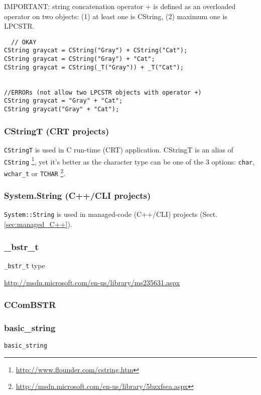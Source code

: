 IMPORTANT: string concatenation operator + is defined as an overloaded operator
on two objects: (1) at least one is CString, (2) maximum one is LPCSTR.
\begin{verbatim}
  // OKAY
CString graycat = CString("Gray") + CString("Cat");
CString graycat = CString("Gray") + "Cat";
CString graycat = CString(_T("Gray")) + _T("Cat");


//ERRORs (not allow two LPCSTR objects with operator +)
CString graycat = "Gray" + "Cat";
CString graycat("Gray" + "Cat");
\end{verbatim}

\subsubsection{CStringT (CRT projects)}

\verb!CStringT! is used in C run-time (CRT) application. CStringT is an alias of
\verb!CString! \footnote{\url{http://www.flounder.com/cstring.htm}}, yet it's
better as the character type can be one of the 3 options: \verb!char!,
\verb!wchar_t! or \verb!TCHAR!
\footnote{\url{http://msdn.microsoft.com/en-us/library/5bzxfsea.aspx}}.

\subsubsection{System.String (C++/CLI projects)}
\label{sec:System.String}

\verb!System::String! is used in managed-code (C++/CLI) projects
(Sect.\ref{sec:managed_C++}).

\subsubsection{\_bstr\_t}
\label{sec:_bstr_t}

\verb!_bstr_t! type
 
 \url{http://msdn.microsoft.com/en-us/library/ms235631.aspx}
 
\subsubsection{CComBSTR}
\label{sec:CComBSTR}

\subsubsection{basic\_string}
\label{sec:basic_string}

\verb!basic_string! 

